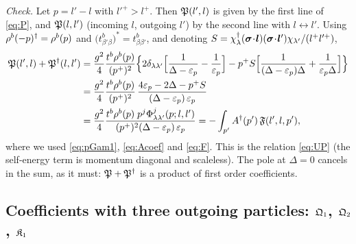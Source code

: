 \emph{Check.} Let $p=l'-l$ with $l'^{+}>l^{+}$. Then $\mathfrak{P}(l',l)$ is given by the first line of
\eqref{eq:P}, and $\mathfrak{P}(l,l')$ (incoming $l$, outgoing $l'$) by the second line with $l\leftrightarrow l'$.
Using $\rho^{b}(-p)^{\dagger}=\rho^{b}(p)$ and $\big(t^{b}_{\beta'\beta}\big)^{*}=t^{b}_{\beta\beta'}$, and denoting
$S=\chi^{\dagger}_{\lambda}(\bm\sigma\!\cdot\!\bm l)(\bm\sigma\!\cdot\!\bm l')\chi_{\lambda'}/(l^{+}l'^{+})$,
\begin{align}
\mathfrak{P}(l',l)+\mathfrak{P}^{\dagger}(l,l')&=\frac{g^{2}}{4}\frac{t^{b}\rho^{b}(p)}{(p^{+})^{2}}
\Big\{2\delta_{\lambda\lambda'}\Big[\frac{1}{\Delta-\varepsilon_{p}}-\frac{1}{\varepsilon_{p}}\Big]
-p^{+}S\Big[\frac{1}{(\Delta-\varepsilon_{p})\Delta}+\frac{1}{\varepsilon_{p}\Delta}\Big]\Big\}
\nonumber\\
&=\frac{g^{2}}{4}\frac{t^{b}\rho^{b}(p)}{(p^{+})^{2}}\,
\frac{4\varepsilon_{p}-2\Delta-p^{+}S}{(\Delta-\varepsilon_{p})\,\varepsilon_{p}}
\nonumber\\
&=\frac{g^{2}}{4}\frac{t^{b}\rho^{b}(p)\;p^{j}\Phi^{j}_{\lambda\lambda'}(p;l,l')}{(p^{+})^{2}(\Delta-\varepsilon_{p})\,\varepsilon_{p}}
=-\int_{p'}A^{\dagger}(p')\,\mathfrak{F}(l',l,p'),
\end{align}
where we used \eqref{eq:pGam1}, \eqref{eq:Acoef} and \eqref{eq:F}. This is the relation \eqref{eq:UP} (the
self-energy term is momentum diagonal and scaleless). The pole at $\Delta=0$ cancels in the sum, as
it must: $\mathfrak{P}+\mathfrak{P}^{\dagger}$ is a product of first order coefficients.

\subsection{Coefficients with three outgoing particles: $\mathfrak{Q}_{1}$, $\mathfrak{Q}_{2}$, $\mathfrak{K}_{1}$}

